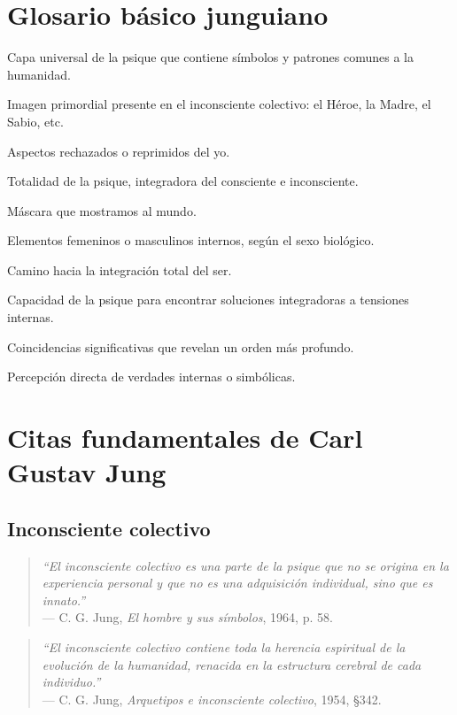 \section*{Glosario básico junguiano}
\begin{description}[leftmargin=1.5cm]
	\item[Inconsciente colectivo] Capa universal de la psique que contiene símbolos y patrones comunes a la humanidad.
	\item[Arquetipo] Imagen primordial presente en el inconsciente colectivo: el Héroe, la Madre, el Sabio, etc.
	\item[Sombra] Aspectos rechazados o reprimidos del yo.
	\item[Self] Totalidad de la psique, integradora del consciente e inconsciente.
	\item[Persona] Máscara que mostramos al mundo.
	\item[Ánima/Ánimus] Elementos femeninos o masculinos internos, según el sexo biológico.
	\item[Individuación] Camino hacia la integración total del ser.
	\item[Función trascendente] Capacidad de la psique para encontrar soluciones integradoras a tensiones internas.
	\item[Sincronicidad] Coincidencias significativas que revelan un orden más profundo.
	\item[Intuición] Percepción directa de verdades internas o simbólicas.
\end{description}

\section*{Citas fundamentales de Carl Gustav Jung}

\subsection*{Inconsciente colectivo}

\begin{quote}
	\emph{“El inconsciente colectivo es una parte de la psique que no se origina en la experiencia personal y que no es una adquisición individual, sino que es innato.”} \\
	— C. G. Jung, \emph{El hombre y sus símbolos}, 1964, p. 58.
\end{quote}

\begin{quote}
	\emph{“El inconsciente colectivo contiene toda la herencia espiritual de la evolución de la humanidad, renacida en la estructura cerebral de cada individuo.”} \\
	— C. G. Jung, \emph{Arquetipos e inconsciente colectivo}, 1954, §342.
\end{quote}

